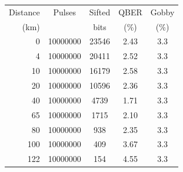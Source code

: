 \begin{tabular}{rcccc}
  Distance & Pulses & Sifted & QBER & Gobby \\
  (km)     &        & bits   & (\%) & (\%)   \\
\hline
  0 & 10000000 & 23546 & 2.43 & 3.3 \\
  4 & 10000000 & 20411 & 2.52 & 3.3 \\
  10 & 10000000 & 16179 & 2.58 & 3.3 \\
  20 & 10000000 & 10596 & 2.36 & 3.3 \\
  40 & 10000000 & 4739 & 1.71 & 3.3 \\
  65 & 10000000 & 1715 & 2.10 & 3.3 \\
  80 & 10000000 & 938 & 2.35 & 3.3 \\
  100 & 10000000 & 409 & 3.67 & 3.3 \\
  122 & 10000000 & 154 & 4.55 & 3.3 \\
\end{tabular}
